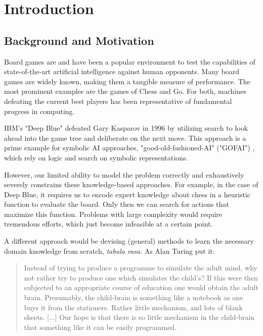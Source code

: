 \chapter{Introduction}
\label{introduction}
\section{Background and Motivation}
Board games are and have been a popular environment to test the capabilities of state-of-the-art artificial intelligence against human opponents. Many board games are widely known, making them a tangible measure of performance. The most prominent examples are the games of Chess and Go. For both, machines defeating the current best players has been representative of fundamental progress in computing.

IBM's "Deep Blue" defeated Gary Kasparov in 1996 \cite{higgins_brief_2017} by utilizing search to look ahead into the game tree and deliberate on the next move. This approach is a prime example for symbolic AI approaches, "good-old-fashioned-AI" ("GOFAI") \cite[p. 112f]{haugeland_artificial_1985}, which rely on logic and search on symbolic representations.

However, our limited ability to model the problem correctly and exhaustively severely constrains these knowledge-based approaches. For example, in the case of Deep Blue, it requires us to encode expert knowledge about chess in a heuristic function to evaluate the board. Only then we can search for actions that maximize this function. Problems with large complexity would require tremendous efforts, which just become infeasible at a certain point.

A different approach would be devising (general) methods to learn the necessary domain knowledge from scratch,  \emph{tabula rasa}. As Alan Turing put it:

\begin{quote}
    Instead of trying to produce a programme to simulate the adult mind, why not rather try to produce one which simulates the child's? If this were then subjected to an appropriate course of education one would obtain the adult brain. Presumably, the child-brain is something like a notebook as one buys it from the stationers. Rather little mechanism, and lots of blank sheets. [...] Our hope is that there is so little mechanism in the child-brain that something like it can be easily programmed.
    \cite{turing_icomputing_1950}
\end{quote}

